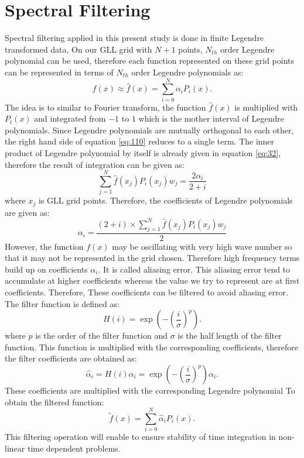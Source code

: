 \documentclass[12pt]{report}
\begin{document}
\section{Spectral Filtering \label{Filter}}
Spectral filtering applied in this present study is done in finite Legendre transformed data, On our GLL grid with $N+1$ points, $N_{th}$ order Legendre polynomial can be used, therefore each function represented on these grid points can be represented in terms of $N_{th}$ order Legendre polynomials as:
\begin{equation}
\label{eq:110}
f(x)\approx \hat{f}(x)= \sum_{i=0}^{N}\alpha_i P_i(x).
\end{equation}
The idea is to similar to Fourier transform, the function $\hat{f}(x)$ is multiplied with $P_i(x)$ and integrated from $-1$ to $1$ which is the mother interval of Legendre polynomials. Since Legendre polynomials are mutually orthogonal to each other, the right hand side of equation \ref{eq:110} reduces to a single term. The inner product of Legendre polynomial by itself is already given in equation \ref{eq:32}, therefore the result of integration can be given as:
\begin{equation}
\label{eq:111}
\sum_{j=1}^{N}\hat{f}(x_j)P_i(x_j)w_j=\frac{2 \alpha_i}{2+i}
\end{equation}
where $x_j$ is GLL grid points. Therefore, the coefficients of Legendre polynomials are given as:
\begin{equation}
\label{eq:112}
\alpha_i=\frac{(2+i)\times \sum_{j=1}^{N}\hat{f}(x_j)P_i(x_j)w_j}{2}
\end{equation}
However, the function $f(x)$ may be oscillating with very high wave number so that it may not be represented in the grid chosen. Therefore high frequency terms build up on coefficients $\alpha_i$. It is called aliasing error\cite{Hesthaven}. This aliasing error tend to accumulate at higher coefficients whereas the value we try to represent are at first coefficients. Therefore, These coefficients can be filtered to avoid aliasing error. The filter function is defined as:
\begin{equation}
H(i)=\exp(-(\frac{i}{\sigma})^p).
\end{equation}
where $p$ is the order of the filter function and $\sigma$ is the half length of the filter function. This function is multiplied with the corresponding coefficients, therefore the filter coefficients are obtained as:
\begin{equation}
\label{eq:113}
\hat{\alpha}_i=H(i)\alpha_i=\exp(-(\frac{i}{\sigma})^p)\alpha_i.
\end{equation}
These coefficients are multiplied with the corresponding Legendre polynomial To obtain the filtered function:
\begin{equation}
\label{eq:114}
\tilde{f}(x)=\sum_{i=0}^{N}\hat{\alpha}_i P_i(x).
\end{equation}
This filtering operation will enable to ensure stability of time integration in non-linear time dependent problems.
\end{document}
